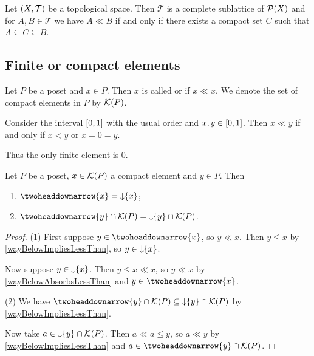 \begin{example}
Let $\sSet{X,\mathcal{T}}$ be a topological space. Then $\mathcal{T}$ is a complete sublattice of $\operatorname{\mathcal{P}}(X)$ and for $A,B\in \mathcal{T}$ we have $A \ll B$ if and only if there exists a compact set $C$ such that $A\subseteq C\subseteq B$. 
\end{example}

\subsection{Finite or compact elements}
\begin{definition}
Let $P$ be a poset and $x\in P$. Then $x$ is called  or  if $x\ll x$. We denote the set of compact elements in $P$ by $\operatorname{\mathcal{K}}(P)$.
\end{definition}

\begin{example}
Consider the interval $\interval{0,1}$ with the usual order and $x,y\in \interval{0,1}$. Then $x\ll y$ if and only if $x < y$ or $x=0=y$.

Thus the only finite element is $0$.
\end{example}

\begin{lemma} \label{downsetCompactElement}
Let $P$ be a poset, $x\in \operatorname{\mathcal{K}}(P)$ a compact element and $y\in P$. Then
\begin{enumerate}
\item $\ddownset\{x\} = \downset\{x\}$;
\item $\ddownset\{y\} \cap \compacts(P) = \downset\{y\} \cap \compacts(P)$.
\end{enumerate}
\end{lemma}
\begin{proof}
(1) First suppose $y\in \ddownset\{x\}$, so $y \ll x$. Then $y\leq x$ by \ref{wayBelowImpliesLessThan}, so $y\in \operatorname{\downarrow}\{x\}$.

Now suppose $y\in \operatorname{\downarrow}\{x\}$. Then $y \leq x \ll x$, so $y \ll x$ by \ref{wayBelowAbsorbsLessThan} and $y\in \ddownset\{x\}$.

(2) We have $\ddownset\{y\} \cap \compacts(P) \subseteq \downset\{y\} \cap \compacts(P)$ by \ref{wayBelowImpliesLessThan}.

Now take $a\in \operatorname{\downarrow}\{y\} \cap \operatorname{\mathcal{K}}(P)$. Then $a \ll a \leq y$, so $a\ll y$ by \ref{wayBelowImpliesLessThan} and $a\in \ddownset\{y\} \cap \compacts(P)$.
\end{proof}

